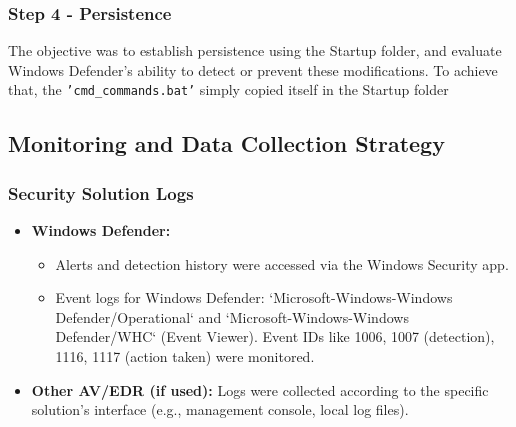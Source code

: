 \documentclass[11pt]{article}
\begin{document}
				\subsubsection{Step 4 - Persistence}
					The objective was to establish persistence using the Startup folder, and evaluate Windows Defender's ability to detect or prevent these modifications. To achieve that, the \texttt{'cmd\_commands.bat'} simply copied itself in the Startup folder
				
				
				
			\subsection{Monitoring and Data Collection Strategy}
				\subsubsection{Security Solution Logs}
				\begin{itemize}
					\item \textbf{Windows Defender:}
					\begin{itemize}
						\item Alerts and detection history were accessed via the Windows Security app.
						\item Event logs for Windows Defender: `Microsoft-Windows-Windows Defender/Operational` and `Microsoft-Windows-Windows Defender/WHC` (Event Viewer). Event IDs like 1006, 1007 (detection), 1116, 1117 (action taken) were monitored.
					\end{itemize}
					\item \textbf{Other AV/EDR (if used):} Logs were collected according to the specific solution's interface (e.g., management console, local log files).
				\end{itemize}
				
\end{document}
